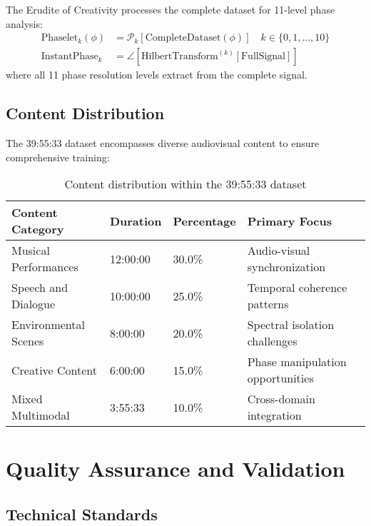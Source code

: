 \begin{definition}
The Erudite of Creativity processes the complete dataset for 11-level phase analysis:
\begin{align}
\text{Phaselet}_{k}(\phi) &= \mathcal{P}_k[\text{CompleteDataset}(\phi)] \quad k \in \{0,1,...,10\} \\
\text{InstantPhase}_{k} &= \angle[\text{HilbertTransform}^{(k)}[\text{FullSignal}]]
\end{align}
where all 11 phase resolution levels extract from the complete signal.
\end{definition}

\subsection{Content Distribution}

The 39:55:33 dataset encompasses diverse audiovisual content to ensure comprehensive training:

\begin{table}[h]
\centering
\begin{tabular}{|l|l|l|l|}
\hline
\textbf{Content Category} & \textbf{Duration} & \textbf{Percentage} & \textbf{Primary Focus} \\
\hline
Musical Performances & 12:00:00 & 30.0\% & Audio-visual synchronization \\
\hline
Speech and Dialogue & 10:00:00 & 25.0\% & Temporal coherence patterns \\
\hline
Environmental Scenes & 8:00:00 & 20.0\% & Spectral isolation challenges \\
\hline
Creative Content & 6:00:00 & 15.0\% & Phase manipulation opportunities \\
\hline
Mixed Multimodal & 3:55:33 & 10.0\% & Cross-domain integration \\
\hline
\end{tabular}
\caption{Content distribution within the 39:55:33 dataset}
\end{table}

\section{Quality Assurance and Validation}

\subsection{Technical Standards}

